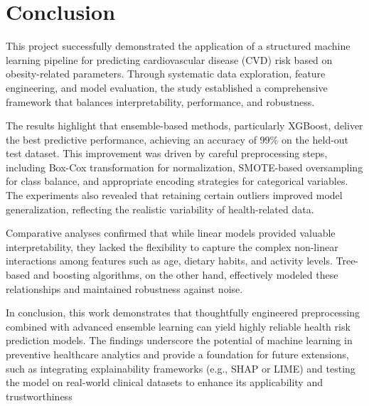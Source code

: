 
    {
    \let\clearpage\relax
    \let\cleardoublepage\relax


    \chapter{Conclusion}
}

This project successfully demonstrated the application of a structured machine learning pipeline for predicting cardiovascular disease (CVD) risk based on obesity-related parameters.
Through systematic data exploration, feature engineering, and model evaluation, the study established a comprehensive framework that balances interpretability, performance, and robustness.

The results highlight that ensemble-based methods, particularly XGBoost, deliver the best predictive performance, achieving an accuracy of 99\% on the held-out test dataset.
This improvement was driven by careful preprocessing steps, including Box-Cox transformation for normalization, SMOTE-based oversampling for class balance, and appropriate encoding strategies for categorical variables.
The experiments also revealed that retaining certain outliers improved model generalization, reflecting the realistic variability of health-related data.

Comparative analyses confirmed that while linear models provided valuable interpretability, they lacked the flexibility to capture the complex non-linear interactions among features such as age, dietary habits, and activity levels.
Tree-based and boosting algorithms, on the other hand, effectively modeled these relationships and maintained robustness against noise.

In conclusion, this work demonstrates that thoughtfully engineered preprocessing combined with advanced ensemble learning can yield highly reliable health risk prediction models.
The findings underscore the potential of machine learning in preventive healthcare analytics and provide a foundation for future extensions, such as integrating explainability frameworks (e.g., SHAP or LIME) and testing the model on real-world clinical datasets to enhance its applicability and trustworthiness
